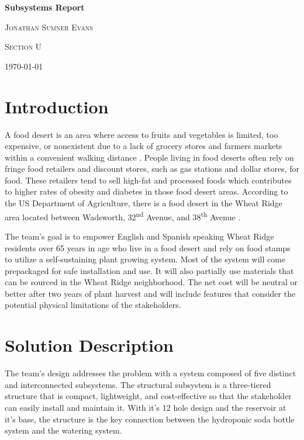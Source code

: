\documentclass[12pt]{article}
\let\supscr=\textsuperscript
\newcommand{\graytext}[1]{{\leavevmode\color{gray}#1}}
\begin{document}
\begin{titlepage}
    \centering
    \vspace{15cm}
    {\huge\bfseries Subsystems Report \par}
    \vspace{1cm}
    {\scshape\Large Jonathan Sumner Evans\par}
    \vfill
    {\scshape\large Section U\par}
    {\large \today\par}
    \vfill
\end{titlepage}

\tableofcontents

\graytext{
    \pagebreak
    \section{Introduction}
    A food desert is an area where access to fruits and vegetables is limited, too expensive, or
    nonexistent due to a lack of grocery stores and farmers markets within a convenient walking
    distance \cite{cdc-food-deserts}. People living in food deserts often rely on fringe food
    retailers and discount stores, such as gas stations and dollar stores, for food. These retailers
    tend to sell high-fat and processed foods which contributes to higher rates of obesity and
    diabetes in those food desert areas. According to the US Department of Agriculture, there is a
    food desert in the Wheat Ridge area located between Wadsworth, 32\supscr{nd} Avenue, and
    38\supscr{th} Avenue \cite{usda-food-deserts}.

    The team’s goal is to empower English and Spanish speaking Wheat Ridge residents over 65 years
    in age who live in a food desert and rely on food stamps to utilize a self-sustaining plant
    growing system. Most of the system will come prepackaged for safe installation and use. It will
    also partially use materials that can be sourced in the Wheat Ridge neighborhood. The net cost
    will be neutral or better after two years of plant harvest and will include features that
    consider the potential physical limitations of the stakeholders.

    \section{Solution Description}
    The team’s design addresses the problem with a system composed of five distinct and
    interconnected subsystems. The structural subsystem is a three-tiered structure that is compact,
    lightweight, and cost-effective so that the stakeholder can easily install and maintain it. With
    it’s 12 hole design and the reservoir at it’s base, the structure is the key connection between
    the hydroponic soda bottle system and the watering system.

}
\end{document}
